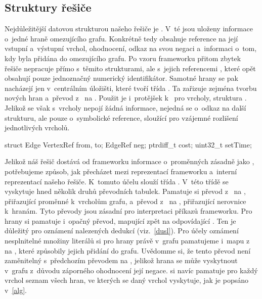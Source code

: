 \subsection*{Struktury řešiče}
Nejdůležitější datovou strukturou našeho řešiče je . V~té jsou uloženy informace o~jedné hraně omezujícího grafu. Konkrétně tedy obsahuje reference na její vstupní a~výstupní vrchol, ohodnocení, odkaz na svou negaci a~informaci o~tom, kdy byla přidána do omezujícího grafu. Po vzoru frameworku přitom zbytek řešiče nepracuje přímo s~těmito strukturami, ale s~jejich referencemi , které opět obsahují pouze jednoznačný numerický identifikátor. Samotné hrany se pak nacházejí jen v~centrálním úložišti, které tvoří třída . Ta zařizuje zejména tvorbu nových hran a~převod z~ na . Použit je i~protějšek k~ pro vrcholy, struktura . Jelikož se však s~vrcholy nepojí žádná informace, nejedná se o~odkaz na další strukturu, ale pouze o~symbolické reference, sloužící pro vzájemné rozlišení jednotlivých vrcholů.

\begin{code}[label=Deklarace struktury Edge]
struct Edge {
    VertexRef from, to;    
    EdgeRef neg;           
    ptrdiff_t cost;
    uint32_t setTime;
}
\end{code}

Jelikož náš řešič dostává od frameworku informace o~proměnných zásadně jako , potřebujeme způsob, jak přecházet mezi reprezentací frameworku a~interní reprezentací našeho řešiče. K~tomuto účelu slouží třída . V~této třídě se vyskytuje hned několik druhů převodních tabulek. Pamatuje si převod z~ na , přiřazující proměnné k~vrcholům grafu, a~převod z~ na , přiřazující nerovnice k~hranám. Tyto převody jsou zásadní pro interpretaci příkazů frameworku. Pro hrany si pamatuje i~opačný převod, mapující  zpět na odpovídající . Ten je důležitý pro oznámení nalezených dedukcí (viz.~\ref{dusl}). Pro účely oznámení nesplnitelné množiny literálů si pro hrany právě v~grafu pamatujeme i~mapu z~ na , které způsobily jejich přidání do grafu. Uvědomme si, že tento převod není zaměnitelný s~předchozím převodem na , jelikož hrana se může vyskytnout v~grafu z~důvodu záporného ohodnocení její negace.  si navíc pamatuje pro každý vrchol seznam všech hran, ve kterých se daný vrchol vyskytuje, jak je popsáno v~\ref{alg}.


